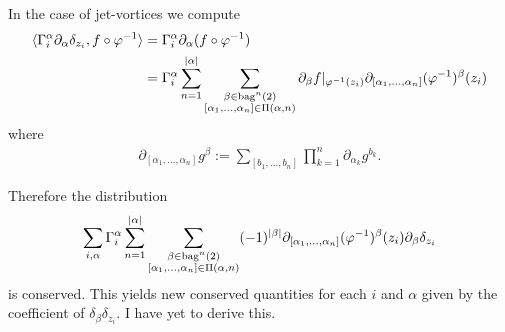 \documentclass[12pt]{amsart}
\DeclareMathOperator{\SDiff}{SDiff}
\begin{document}
In the case of jet-vortices we compute
\begin{align*}
  \langle \Gamma_i^\alpha \partial_\alpha \delta_{z_i} , f \circ \varphi^{-1} \rangle &= \Gamma_i^\alpha \partial_{\alpha} ( f \circ \varphi^{-1}) \\
  &= \Gamma_i^\alpha \sum_{n=1}^{|\alpha|} \sum_{
    \substack{
      \beta \in {\rm bag}^n(2) \\
      [\alpha_1,\dots,\alpha_n] \in \Pi(\alpha,n)
      }
     }
     \partial_{\beta}f|_{\varphi^{-1}(z_i)}
     \partial_{[\alpha_1,\dots,\alpha_n]} (\varphi^{-1})^{\beta}(z_i)
\end{align*}
where
\begin{align*}
  \partial_{[\alpha_1,\dots,\alpha_n]} g^\beta := 
  \sum_{[b_1,\dots,b_n]}\prod_{k=1}^n \partial_{\alpha_k} g^{b_k}.
\end{align*}

Therefore the distribution
\begin{align*}
 \sum_{i,\alpha} \Gamma_i^\alpha \sum_{n=1}^{|\alpha|} \sum_{
    \substack{
      \beta \in {\rm bag}^n(2) \\
      [\alpha_1,\dots,\alpha_n] \in \Pi(\alpha,n)
      }
     }
     (-1)^{|\beta|} \partial_{[\alpha_1,\dots,\alpha_n]} (\varphi^{-1})^\beta(z_i)
     \partial_{\beta} \delta_{z_i}
\end{align*}
is conserved.
This yields new conserved quantities for each $i$ and $\alpha$
given by the coefficient of $\delta_\beta \delta_{z_i}$.  I have yet to derive this.



\end{document}
